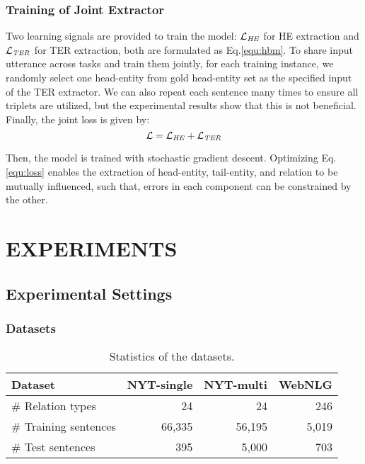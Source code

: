 \documentclass{ecai}
\begin{document}
\subsubsection{Training of Joint Extractor} 
Two learning signals are provided to train the model: $\mathcal{L}_{\text{\emph{HE}}}$ for HE extraction and $\mathcal{L}_{\text{\emph{TER}}}$ for TER extraction, both are formulated as Eq.\ref{equ:hbm}.
To share input utterance across tasks and train them jointly, for each training instance, we randomly select one head-entity from gold head-entity set as the specified input of the TER extractor. 
We can also repeat each sentence many times to ensure all triplets are utilized, but the experimental results show that this is not beneficial. 
Finally, the joint loss is given by: 
\begin{equation}
\label{equ:loss}
\mathcal{L} = \mathcal{L}_{\text{\emph{HE}}} + \mathcal{L}_{\text{\emph{TER}}}
\end{equation} 


Then, the model is trained with stochastic gradient descent.
Optimizing Eq.\ref{equ:loss} enables the extraction of head-entity, tail-entity, and relation to be mutually influenced, such that, errors in each component can be constrained by the other. 


\section{EXPERIMENTS}

\subsection{Experimental Settings}

\subsubsection{Datasets}

\begin{table}
\begin{center}
{\caption{Statistics of the datasets.}
    \label{datasets}}
    \begin{tabular}{lrrr}\toprule
        Dataset & NYT-single & NYT-multi & WebNLG \\
    \midrule
        \# Relation types & 24 & 24 & 246 \\
\# Training sentences & 66,335 & 56,195 & 5,019 \\
        \# Test sentences & 395 & 5,000 & 703 \\


    \bottomrule
    \end{tabular}
\end{center}
\end{table}
\end{document}
